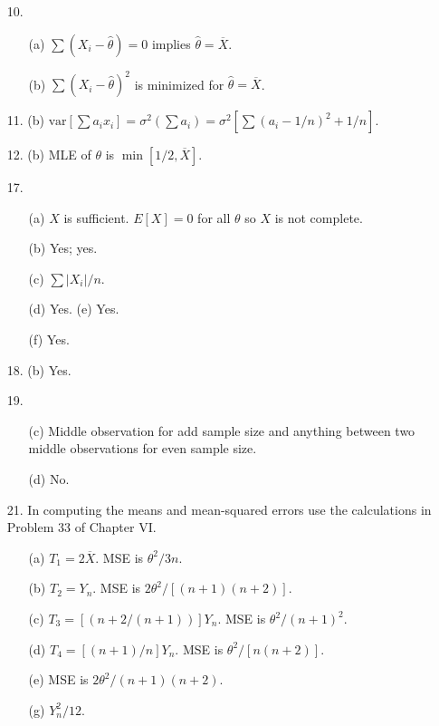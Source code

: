 \begin{enumerate}
	\item[10.] \begin{enumerate}
		\item[(a)] $\sum(X_i - \hat{\theta}) = 0$ implies $\hat{\theta}=\overline{X}$.
		\item[(b)] $\sum(X_i - \hat{\theta})^2$ is minimized for $\hat{\theta}=\overline{X}$.
	\end{enumerate}
	
	\item[11.] (b) $\mbox{var}[\sum a_ix_i] = \sigma^2(\sum a_i) = \sigma^2[\sum(a_i-1/n)^2 + 1/n]$.
	
	\item[12.] (b) MLE of $\theta$ is $\min[1/2, \overline{X}]$.
	  
	 \newpage
	 \item[17.] \begin{enumerate}
	 	\item[(a)] $X$ is sufficient. $E[X]=0$ for all $\theta$ so $X$ is not complete.
	 	\item[(b)] Yes; yes.
	 	\item[(c)] $\sum \vert X_i\vert/n$.
	 	\item[(d)] Yes. (e) Yes.
		\item[(f)] Yes.	
	\end{enumerate}
	
	\item[18.] (b) Yes.
	
	\item[19.] \begin{enumerate}
		\item[(c)] Middle observation for add sample size and anything between two middle observations for even sample size.
		\item[(d)] No.
	\end{enumerate}
	
	\item[21.] In computing the means and mean-squared errors use the calculations in Problem 33 of Chapter VI.
	\begin{enumerate}
		\item[(a)] $T_1 = 2\overline{X}$. MSE is $\theta^2/3n$.
		\item[(b)] $T_2 = Y_n$. MSE is $2\theta^2/[(n+1)(n+2)]$.
		\item[(c)] $T_3 = [(n+2/(n+1))]Y_n.$ MSE is $\theta^2/(n+1)^2$.
		\item[(d)] $T_4 = [(n+1)/n]Y_n.$ MSE is $\theta^2/[n(n+2)]$.
		\item[(e)] MSE is $2\theta^2/(n+1)(n+2)$.
		\item[(g)] $Y_n^2/12$.
	\end{enumerate}
	

\end{enumerate}
